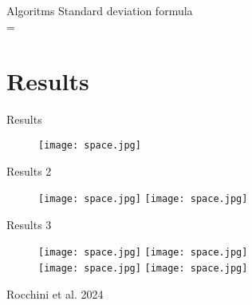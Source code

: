 \documentclass{beamer} %
\begin{document}
\begin{frame}{Algoritms} 
Standard deviation formula \\
\bigskip
\centering %
    \delta =  

\section{Results} %
\begin{frame}{Results} %
    \begin{figure}
        \centering
        \texttt{[image: space.jpg]}
        \label{fig:enter-label}
\end{figure}
\end{frame}

\begin{frame}{Results 2} %
    \begin{figure}
        \centering
        \texttt{[image: space.jpg]}
        \texttt{[image: space.jpg]}
\end{figure}
\end{frame}


\begin{frame}{Results 3} %
    \begin{figure}
        \centering
        \texttt{[image: space.jpg]}
        \texttt{[image: space.jpg]} \\ %
        \texttt{[image: space.jpg]}
        \texttt{[image: space.jpg]} \\ %
\end{figure}
\bigskip %
\centering
\scriptsize{Rocchini et al. 2024} %
\end{frame}


\end{frame}
\end{document}
